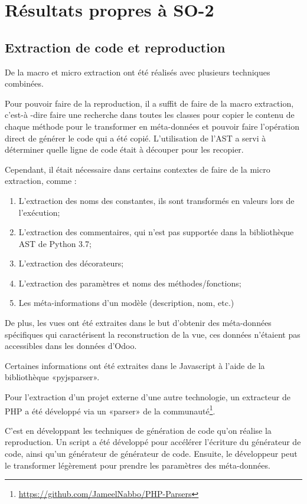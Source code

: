 \section{Résultats propres à SO-2}

\subsection {Extraction de code et reproduction}

De la macro et micro extraction ont été réalisés avec plusieurs techniques combinées.

Pour pouvoir faire de la reproduction, il a suffit de faire de la macro extraction, c'est-à -dire faire une recherche dans toutes les classes pour copier le contenu de chaque méthode pour le transformer en méta-données et pouvoir faire l’opération direct de générer le code qui a été copié. L’utilisation de l’AST a servi à déterminer quelle ligne de code était à découper pour les recopier.

Cependant, il était nécessaire dans certains contextes de faire de la micro extraction, comme : 
\begin{enumerate}
    \item L’extraction des noms des constantes, ils sont transformés en valeurs lors de l’exécution;
    \item L’extraction des commentaires, qui n’est pas supportée dans la bibliothèque AST de Python 3.7;
    \item L’extraction des décorateurs;
    \item L’extraction des paramètres et noms des méthodes/fonctions;
    \item Les méta-informations d’un modèle (description, nom, etc.)
\end{enumerate}

De plus, les vues ont été extraites dans le but d'obtenir des méta-données spécifiques qui caractérisent la reconstruction de la vue, ces données n’étaient pas accessibles dans les données d'Odoo.

Certaines informations ont été extraites dans le Javascript à l’aide de la bibliothèque «pyjsparser».

Pour l’extraction d'un projet externe d'une autre technologie, un extracteur de PHP a été développé via un «parser» de la communauté\footnote{\url{https://github.com/JameelNabbo/PHP-Parsers}}.

C'est en développant les techniques de génération de code qu'on réalise la reproduction. Un script a été développé pour accélérer l’écriture du générateur de code, ainsi qu'un générateur de générateur de code. Ensuite, le développeur peut le transformer légèrement pour prendre les paramètres des méta-données.

